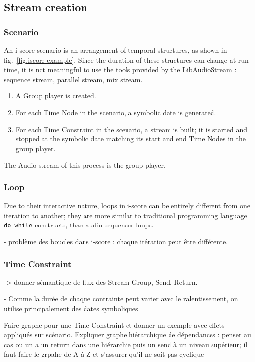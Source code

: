 \documentclass{article}
\begin{document}
\subsection{Stream creation}
\subsubsection{Scenario}
An i-score scenario is an arrangement of temporal structures, as shown in fig.~\ref{fig.iscore-example}.
Since the duration of these structures can change at run-time, it is not meaningful to use the tools provided by the LibAudioStream : sequence stream, parallel stream, mix stream.

\begin{enumerate}
	\item A Group player is created.
	\item For each Time Node in the scenario, a symbolic date is generated.
	\item For each Time Constraint in the scenario, a stream is built; it is started and stopped at the symbolic date matching its start and end Time Nodes in the group player.
\end{enumerate}

The Audio stream of this process is the group player.

\subsubsection{Loop}
Due to their interactive nature, loops in i-score can be entirely different from 
one iteration to another; they are more similar to traditional programming language \texttt{do-while} constructs, than audio sequencer loops.

- problème des boucles dans i-score : chaque itération peut être différente.
\subsubsection{Time Constraint}

-> donner sémantique de flux des Stream Group, Send, Return.

- Comme la durée de chaque contrainte peut varier avec le ralentissement, on utilise principalement 
des dates symboliques

Faire graphe pour une Time Constraint et donner un exemple avec effets appliqués sur scénario.
Expliquer graphe hiérarchique de dépendances : penser au cas ou un a un return dans une hiérarchie puis un send à un niveau supérieur; il faut faire le grpahe de A à Z et s'assurer qu'il ne soit pas cyclique
\end{document}
